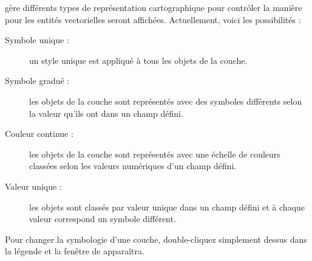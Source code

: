 \qg gère différents types de représentation cartographique pour contrôler la manière pour les entités vectorielles seront affichées. Actuellement, voici les possibilités :

\begin{description}
\item[Symbole unique :]  un style unique est appliqué à tous les objets de la couche.
\item[Symbole gradué :]  les objets de la couche sont représentés avec des symboles différents selon la valeur qu'ils ont dans un champ défini.
\item[Couleur continue :] les objets de la couche sont représentés avec une échelle de couleurs classées selon les valeurs numériques d'un champ défini.
\item[Valeur unique :]  les objets sont classés par valeur unique dans un champ défini et à chaque valeur correspond un symbole différent.
\end{description}

Pour changer la symbologie d'une couche, double-cliquez simplement dessus dans la légende et la fenêtre de  apparaîtra.

